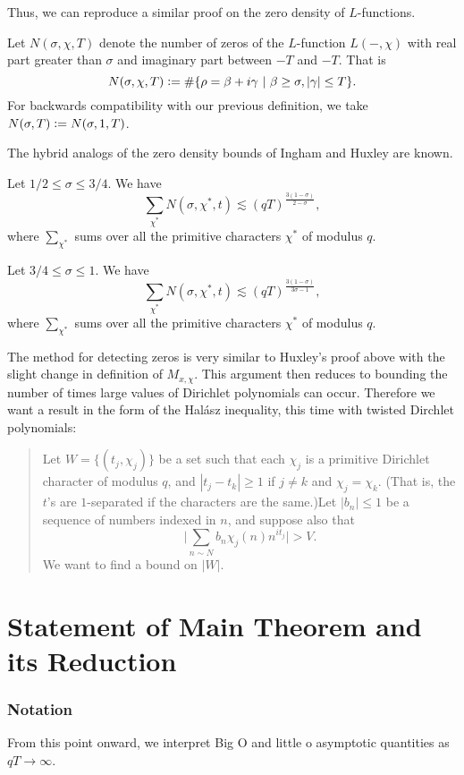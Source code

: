 Thus, we can reproduce a similar proof on the zero density of $L$-functions. 
\begin{definition}
    Let $N(\sigma,\chi,T)$ denote the number of zeros of the $L$-function $L(-,\chi)$ with real part greater than $\sigma$ and imaginary part between $-T$ and $-T$. That is \[
    N(\sigma,\chi,T) \mathrel{\mathop:}= \#\{\rho=\beta+i\gamma \ | \ \beta\geq \sigma, |\gamma|\leq T\}.
    \]
    For backwards compatibility with our previous definition, we take $N(\sigma,T)\mathrel{\mathop:}= N(\sigma, 1,T)$.
\end{definition}
The hybrid analogs of the zero density bounds of Ingham and Huxley are known.
\begin{theorem}
    Let $1/2\leq \sigma\leq 3/4$. We have \[
        \sum_{\chi^* }N(\sigma,\chi^*,t)\lesssim (qT)^{\frac{3(1-\sigma)}{2-\sigma}},
        \]
        where $\sum_{\chi^*}$ sums over all the primitive characters $\chi^*$ of modulus $q$.
\end{theorem}
\begin{theorem}
    Let $3/4\leq \sigma\leq 1$. We have \[
        \sum_{\chi^* }N(\sigma,\chi^*,t)\lesssim (qT)^{\frac{3(1-\sigma)}{3\sigma-1}},
        \]        
        where $\sum_{\chi^*}$ sums over all the primitive characters $\chi^*$ of modulus $q$.
\end{theorem}

The method for detecting zeros is very similar to Huxley's proof above with the slight change in definition of $M_{x,\chi}$. This argument then reduces to bounding the number of times large values of Dirichlet polynomials can occur. Therefore we want a result in the form of the Hal\'asz inequality, this time with twisted Dirchlet polynomials:
\begin{quotation}  
Let $W=\{(t_j,\chi_j)\}$ be a set such that each $\chi_j$ is a primitive Dirichlet character of modulus $q$, and $|t_j-t_k|\geq 1$ if $j\neq k$ and $\chi_j=\chi_k$. (That is, the $t$'s are $1$-separated if the characters are the same.)Let $|b_n|\leq 1$ be a sequence of numbers indexed in $n$, and suppose also that \[
\Bigg|\sum_{n\sim N} b_n\chi_j(n)n^{it_j} \Bigg|>V.
\]
We want to find a bound on $|W|$.
\end{quotation}
\section{Statement of Main Theorem and its Reduction}
\subsubsection*{Notation}
From this point onward, we interpret Big O and little o asymptotic quantities as $qT\to \infty$. 

